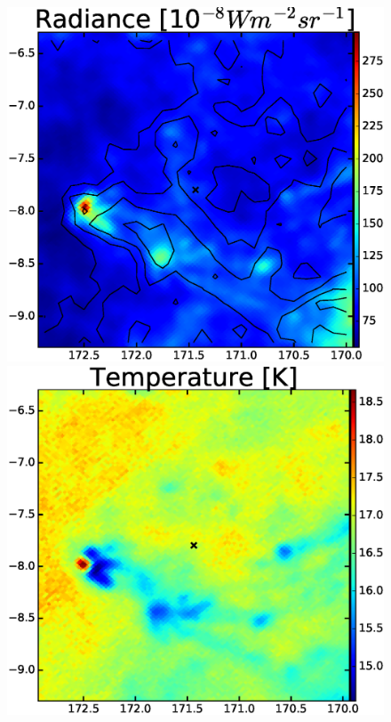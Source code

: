 \documentclass[preprint]{emulateapj}
\begin{document}
\begin{figure}
\includegraphics[scale=0.21]{fig/src_eg_apd0_r0c2.eps}
\includegraphics[scale=0.21]{fig/src_eg_apd0_r0c3.eps}
%


\end{figure}
\end{document}
